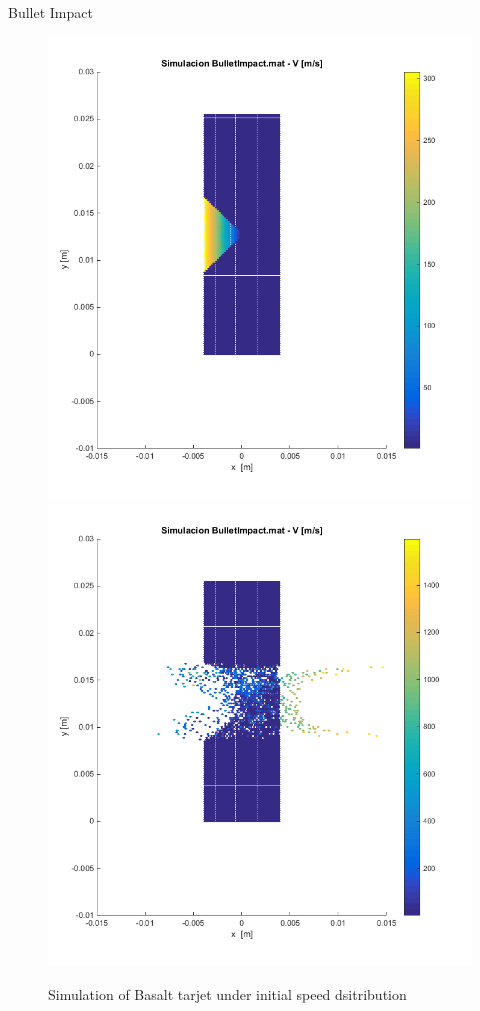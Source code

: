 \documentclass[10pt]{beamer}
\begin{document}
\begin{frame}{Bullet Impact}
\begin{figure}[h!]
\includegraphics[scale=.25]{./images/BI_i.png}
\includegraphics[scale=.25]{./images/BI_f.png}
\caption{Simulation of Basalt tarjet under initial speed dsitribution}
\end{figure}
\end{frame}
\end{document}
